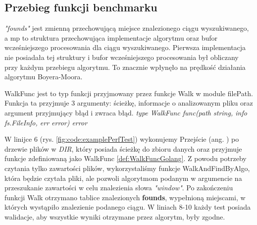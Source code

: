 \subsection{Przebieg funkcji benchmarku}
\textit{"founds"} jest zmienną przechowującą miejsce znalezionego 
ciągu wyszukiwanego, a mp to struktura przechowująca implementacje algorytmu oraz
bufor wcześniejszego procesowania dla ciągu wyszukiwanego. Pierwsza implementacja nie 
posiadała tej struktury i bufor wcześniejszego procesowania był obliczany przy każdym 
przebiegu algorytmu. To znacznie wpłynęło na prędkość działania algorytmu 
Boyera-Moora.

\begin{Definition}\label{def:WalkFuncGolang}
WalkFunc jest to typ funkcji przyjmowany przez funkcje Walk w module filePath.
Funkcja ta przyjmuje 3 argumenty: ścieżkę, informacje o analizowanym pliku oraz
argument przyjmujący błąd i zwraca błąd. \newline \newline
\textit{type WalkFunc func(path string, info fs.FileInfo, err error) error}
\end{Definition}

W linijce 6 (rys. \ref{fig:code:examplePerfTest}) wykonujemy Przejście (ang. 
) po drzewie plików w \textit{DIR}, który posiada ścieżkę do 
zbioru danych oraz przyjmuje funkcje zdefiniowaną jako WalkFunc 
\ref{def:WalkFuncGolang}. Z powodu potrzeby czytania tylko zawartości plików,
wykorzystaliśmy funkcje WalkAndFindByAlgo, która będzie czytała pliki, ale 
pozwoli algorytmom podanym w argumencie na przeszukanie zawartości w celu 
znalezienia słowa \textit{"window"}. Po zakończeniu funkcji Walk otrzymano 
tablice znalezionych \textbf{founds}, wypełnioną miejscami, w których wystąpiło znalezienie podanego
ciągu. W liniach 8-10 każdy test posiada walidacje, aby wszystkie wyniki 
otrzymane przez algorytm, były zgodne.

